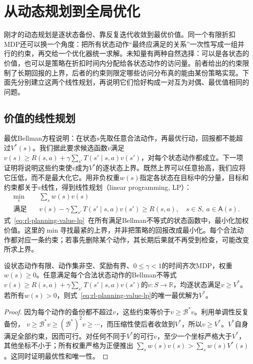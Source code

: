\section{从动态规划到全局优化}
\label{sec:rl-planning-linear-programming}

刚才的动态规划是逐状态备份、靠反复迭代收敛到最优价值。同一个有限折扣MDP还可以换一个角度：把所有状态动作“最终应满足的关系”一次性写成一组并行的约束，再交给一个优化器统一求解。未知量有两种自然选择：可以是各状态的价值，也可以是策略在折扣时间内分配给各状态动作的访问量。前者给出的约束限制了长期回报的上界，后者的约束则限定哪些访问分布真的能由某份策略实现。下面先分别建立这两个线性规划，再说明它们恰好构成一对互为对偶、最优值相同的问题。

\subsection{价值的线性规划}
\label{sec:rl-planning-value-lp}

最优Bellman方程说明：在状态$s$先取任意合法动作，再最优行动，回报都不能超过$V^*(s)$。我们据此要求候选函数$v$满足
$v(s)\geq R(s,a)+\gamma\sum_{s'}T(s'\mid s,a)v(s')$，对每个状态动作都成立。下一项证明将说明这些约束使$v$成为$V^*$的逐状态上界。既然上界可以任意抬高，我们应将它压低，而不是最大化它。用非负权重$w(s)$指定各状态在目标中的分量，目标和约束都关于$v$线性，得到线性规划（linear programming, LP）：
\begin{equation}
 \begin{aligned}
 \min_v\quad &\sum_s w(s)v(s)\\
 \text{满足}\quad
 &v(s)-\gamma\sum_{s'}T(s'\mid s,a)v(s')\geq R(s,a),
 \quad s\in S,\ a\in\mathsf A(s).
 \end{aligned}
 \label{eq:rl-planning-value-lp}
\end{equation}
式~\eqref{eq:rl-planning-value-lp}~在所有满足Bellman不等式的状态函数中，最小化加权价值。这里的$\min$寻找最紧的上界，并非把策略的回报改成最小化。每个合法动作都对应一条约束；若事先删除某个动作，其长期后果就不再受到检查，可能改变所求上界。

\begin{theorem}[价值线性规划的解]
 \label{thm:rl-planning-value-lp}
 设状态动作有限、动作集非空、奖励有界、$0\leq\gamma<1$的时间齐次MDP，权重$w(s)\geq0$。任意满足每个合法状态动作的Bellman不等式$v(s)\geq R(s,a)+\gamma\sum_{s'}T(s'\mid s,a)v(s')$的$v:S\to\mathbb R$，均逐状态满足$v\geq V^*$。若所有$w(s)>0$，则式~\eqref{eq:rl-planning-value-lp}的唯一最优解为$V^*$。
\end{theorem}
\begin{proof}
 因为每个动作的备份都不超过$v$，这些约束等价于$v\geq \mathcal B^*v$。利用单调性反复备份，
 $v\geq \mathcal B^*v\geq(\mathcal B^*)^2v\geq\cdots$，而压缩性使后者收敛到$V^*$，所以$v\geq V^*$。$V^*$自身满足全部约束，因而可行。对任何不同于$V^*$的可行$v$，至少一个坐标严格大于$V^*$，其他坐标不小于；所有权重严格为正便推出
 $\sum_s w(s)v(s)>\sum_s w(s)V^*(s)$。这同时证明最优性和唯一性。
\end{proof}


